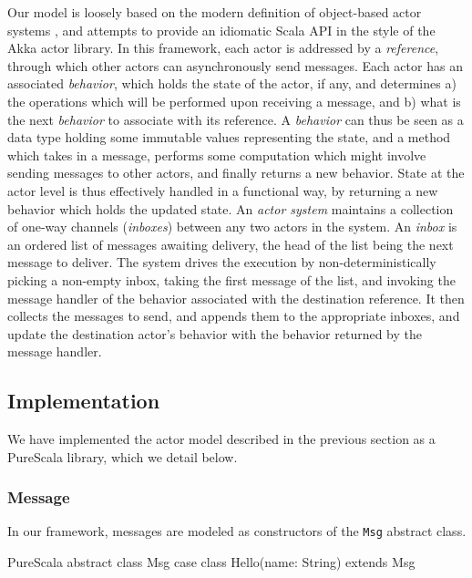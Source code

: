 \documentclass[a4paper,twoside]{article}
\newcommand{\InlineS}[1]{\lstinline[language=PureScala,basicstyle=\small\ttfamily,columns=fixed]|#1|}
\begin{document}
Our model is loosely based on the modern definition of object-based actor systems \cite{algebraicactors}, and attempts to provide an idiomatic Scala API in the style of the Akka actor library. In this framework, each actor is addressed by a \textit{reference}, through which other actors can asynchronously send messages. Each actor has an associated \textit{behavior}, which holds the state of the actor, if any, and determines a) the operations which will be performed upon receiving a message, and b) what is the next \textit{behavior} to associate with its reference. A \textit{behavior} can thus be seen as a data type holding some immutable values representing the state, and a method which takes in a message, performs some computation which might involve sending messages to other actors, and finally returns a new behavior. State at the actor level is thus effectively handled in a functional way, by returning a new behavior which holds the updated state.
An \textit{actor system} maintains a collection of one-way channels (\textit{inboxes}) between any two actors in the system. An \textit{inbox} is an ordered list of messages awaiting delivery, the head of the list being the next message to deliver. The system drives the execution by non-deterministically picking a non-empty inbox, taking the first message of the list, and invoking the message handler of the behavior associated with the destination reference. It then collects the messages to send, and appends them to the appropriate inboxes, and update the destination actor's behavior with the behavior returned by the message handler.

\subsection{Implementation}
\label{actor-impl}

We have implemented the actor model described in the previous section as a PureScala library, which we detail below.

\subsubsection*{Message}

In our framework, messages are modeled as constructors of the \InlineS{Msg} abstract class.

\begin{ShortCode}{PureScala}
abstract class Msg
case class Hello(name: String) extends Msg
\end{ShortCode}
\end{document}
